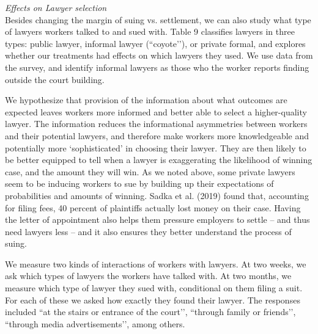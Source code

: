 \documentclass[12 pt]{article}
\begin{document}
\noindent\emph{Effects on Lawyer selection}\\
Besides changing the margin of suing vs. settlement, we can also study what type of lawyers workers talked to and sued with. Table 9 classifies lawyers in three types: public lawyer, informal lawyer (“coyote’’), or private formal, and explores whether our treatments had effects on which lawyers they used. We use data from the survey, and identify informal lawyers as those who the worker reports finding outside the court building. 

We hypothesize that provision of the information about what outcomes are expected leaves workers more informed and better able to select a higher-quality lawyer. The information reduces the informational asymmetries between workers and their potential lawyers, and therefore make workers more knowledgeable and potentially more ‘sophisticated’ in choosing their lawyer. They are then likely to be better equipped to tell when a lawyer is exaggerating the likelihood of winning case, and the amount they will win. As we noted above, some private lawyers seem to be inducing workers to sue by building up their expectations of probabilities and amounts of winning. Sadka et al. (2019) found that, accounting for filing fees, 40 percent of plaintiffs actually lost money on their case. Having the letter of appointment also helps them pressure employers to settle – and thus need lawyers less – and it also ensures they better understand the process of suing. 

We measure two kinds of interactions of workers with lawyers. At two weeks, we ask which types of lawyers the workers have talked with. At two months, we measure which type of lawyer they sued with, conditional on them filing a suit. For each of these we asked how exactly they found their lawyer. The responses included “at the stairs or entrance of the court’’, “through family or friends’’, “through media advertisements’’, among others.
\end{document}
